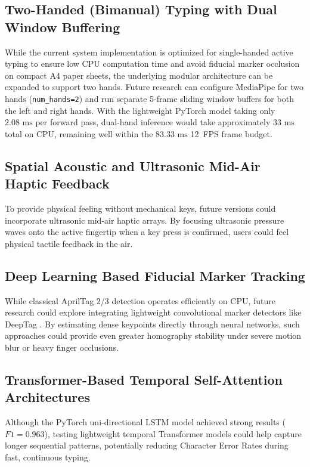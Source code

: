 \subsection{Two-Handed (Bimanual) Typing with Dual Window Buffering}
While the current system implementation is optimized for single-handed active typing to ensure low CPU computation time and avoid fiducial marker occlusion on compact A4 paper sheets, the underlying modular architecture can be expanded to support two hands. Future research can configure MediaPipe for two hands (\texttt{num\_hands=2}) and run separate 5-frame sliding window buffers for both the left and right hands. With the lightweight PyTorch model taking only $2.08\text{ ms}$ per forward pass, dual-hand inference would take approximately $33\text{ ms}$ total on CPU, remaining well within the $83.33\text{ ms}$ 12~FPS frame budget.

\subsection{Spatial Acoustic and Ultrasonic Mid-Air Haptic Feedback}
To provide physical feeling without mechanical keys, future versions could incorporate ultrasonic mid-air haptic arrays. By focusing ultrasonic pressure waves onto the active fingertip when a key press is confirmed, users could feel physical tactile feedback in the air.

\subsection{Deep Learning Based Fiducial Marker Tracking}
While classical AprilTag 2/3 detection operates efficiently on CPU, future research could explore integrating lightweight convolutional marker detectors like DeepTag \cite{Zhang2022DeepTag}. By estimating dense keypoints directly through neural networks, such approaches could provide even greater homography stability under severe motion blur or heavy finger occlusions.

\subsection{Transformer-Based Temporal Self-Attention Architectures}
Although the PyTorch uni-directional LSTM model achieved strong results ($F1 = 0.963$), testing lightweight temporal Transformer models could help capture longer sequential patterns, potentially reducing Character Error Rates during fast, continuous typing.


